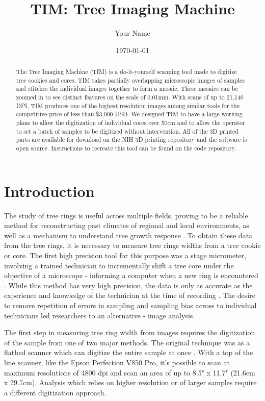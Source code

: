 \documentclass[a4paper,12pt]{article}
\title{TIM: Tree Imaging Machine}
\author{Your Name}
\date{\today}
\begin{document}
\maketitle

\begin{abstract}
The Tree Imaging Machine (TIM) is a do-it-yourself scanning tool made to digitize tree cookies and cores. TIM takes partially overlapping microscopic images of samples and stitches the individual images together to form 
a mosaic. These mosaics can be zoomed in to see distinct features on the scale of 0.01mm. With scans of up to 21,140 DPI, TIM produces one of the highest resolution images among similar tools for the competitive price of less than \$3,000 USD.
We designed TIM to have a large working plane to allow the digitization of individual cores over 50cm and to allow the operator to set a batch of samples to be digitized without intervention. 
All of the 3D printed parts are available for download on the NIH 3D printing repository and the software is 
open source. Instructions to recreate this tool can be found on the code repository. 
\end{abstract}

\section{Introduction}
The study of tree rings is useful across multiple fields, proving to be a reliable method for reconstructing past climates of regional and local environments, as well as a mechanism to understand tree growth response \citep{fritts_dendroclimatology_1971} \citep{williams_using_2010} \citep{guibal_dendrochronology_2021} \citep{sheppard_dendroclimatology_2010}.
To obtain these data from the tree rings, it is necessary to measure tree rings widths from a tree cookie or core. The first high precision tool for this purpose was a stage micrometer, involving a trained technician to incrementally shift a tree core under the objective of a microscope - informing a computer when a new ring is encountered \citep{robinson_microcomputer_nodate}.
While this method has very high precision, the data is only as accurate as the experience and knowledge of the technician at the time of recording \citep{levanic_atrics_2007}.
The desire to remove repetition of errors in sampling and sampling bias across to individual technicians led researchers to an alternative - image analysis. 

The first step in measuring tree ring width from images requires the digitization of the sample from one of two major methods.  
The original technique was as a flatbed scanner which can digitize the entire sample at once \citep{guay_new_1992}. 
With a top of the line scanner, like the Epson Perfection V850 Pro, it's possible to scan at maximum resolutions of 4800 dpi and scan an area of up to 8.5" x 11.7" (21.6cm x 29.7cm).
Analysis which relies on higher resolution or of larger samples require a different digitization approach. 
\end{document}
